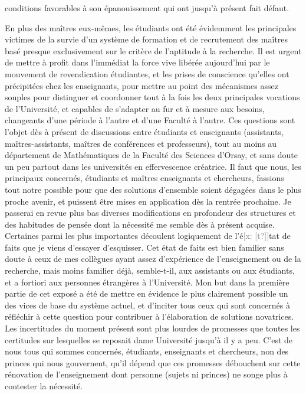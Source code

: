 \documentclass[11pt]{article}
\newcommand{\xout}[1]{\textcolor{gray}{[\textsf{x:} #1]}}
\newcommand{\unsure}[1]{[#1?]}
\begin{document}
conditions favorables à son épanouissement qui ont jusqu'à présent fait défaut.

En plus des maîtres eux-mêmes, les étudiants ont été évidemment les
principales victimes de la survie d'un système de formation et de recrutement
des maîtres basé presque exclusivement sur le critère de l'aptitude à la
recherche. Il est urgent de mettre à profit dans l'immédiat la force vive
libérée aujourd'hui par le mouvement de revendication étudiantes, et les
prises de conscience qu'elles ont précipitées chez les enseignants, pour
mettre au point des mécanismes assez souples pour distinguer et coordonner
tout à la fois les deux principales vocations de l'Université, et capables
de s'adapter au fur et à mesure aux besoins, changeants d'une période à l'autre
et d'une Faculté à l'autre. Ces questions sont l'objet dès à présent de
discussions entre étudiants et enseignants (assistants, maîtres-assistants,
maîtres de conférences et professeurs), tout au moins au département de
Mathématiques de la Faculté des Sciences d'Orsay, et sans doute un peu partout
dans les universités en effervescence créatrice. Il faut que nous, les
principaux concernés, étudiants et maîtres enseignants et chercheurs, fassions
tout notre possible pour que des solutions d'ensemble soient dégagées dans
le plus proche avenir, et puissent être mises en application dès la rentrée
prochaine. Je passerai en revue plus bas diverses modifications en profondeur
des structures et des habitudes de pensée dont la nécessité me semble dès
à présent acquise. Certaines parmi les plus importantes découlent logiquement
de l'é\xout{\unsure{t}}tat de faits que je viens d'essayer d'esquisser. Cet état de faits
est bien familier sans doute à ceux de mes collègues ayant assez d'expérience
de l'enseignement ou de la recherche, mais moins familier déjà, semble-t-il,
aux assistants ou aux étudiants, et a fortiori aux personnes étrangères à
l'Université. Mon but dans la première partie de cet exposé a été de mettre
en évidence le plus clairement possible un des vices de base du système actuel,
et d'inciter tous ceux qui sont concernés à réfléchir à cette question pour
contribuer à l'élaboration de solutions novatrices. Les incertitudes du moment
présent sont plus lourdes de promesses que toutes les certitudes sur lesquelles
se reposait dame Université jusqu'à il y a peu. C'est de nous tous qui sommes
concernés, étudiants, enseignants et chercheurs, non des princes qui nous
gouvernent, qu'il dépend que ces promesses débouchent sur cette rénovation
de l'enseignement dont personne (sujets ni princes) ne songe plus à contester
la nécessité.
\end{document}
